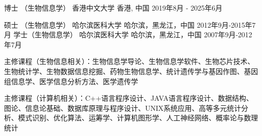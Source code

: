 

\begin{cventries}

    \cventry
        {博士 （生物信息学）} %
        {香港中文大学} %
        {香港, 中国} %
        {2019年8月 - 2025年6月} %
        {
        }

    \cventry
        {硕士 （生物信息学）} %
        {哈尔滨医科大学} %
        {哈尔滨，黑龙江，中国} %
        {2012年9月-2015年7月} %
        {
        }
    \cventry
        {学士（生物信息学）} %
        {哈尔滨医科大学} %
        {哈尔滨，黑龙江，中国} %
        {2007年9月-2012年7月} %
        {
          \begin{cvitems} %
            \item {主修课程（生物信息相关）：生物信息学导论、生物信息学软件、生物芯片技术、生物统计学、生物数据信息挖掘、药物生物信息学、统计遗传学与基因作图、基因组信息学、医学信息分析方法、医学遗传学}
            \item {主修课程（计算机相关）：C++语言程序设计、JAVA语言程序设计、数据结构、图论、信息论基础、数据库原理与程序设计、UNIX系统应用、高等多元统计分析、模式识别、优化算法、运筹学、计算机图形学、人工神经网络、概率论与数理统计}
          \end{cvitems}
        }

\end{cventries}